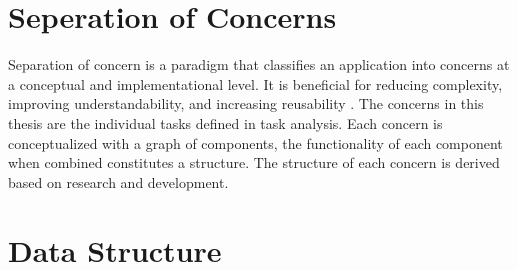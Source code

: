 

\section{Seperation of Concerns}
Separation of concern is a paradigm that classifies an application into concerns at a conceptual and implementational level. It is beneficial for reducing complexity, improving understandability, and increasing reusability \cite{soc}. The concerns in this thesis are the individual tasks defined in task analysis. Each concern is conceptualized with a graph of components, the functionality of each component when combined constitutes a structure. The structure of each concern is derived based on research and development. 



\section{Data Structure}

